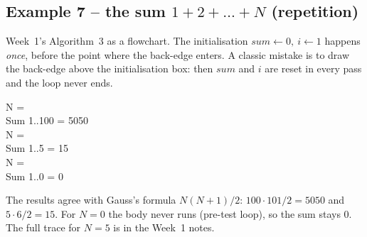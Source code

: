 \documentclass[11pt,a4paper]{article}
\begin{document}
\subsection{Example 7 -- the sum $1 + 2 + \dots + N$ (repetition)}\label{ex:sum}
Week~1's Algorithm~3 as a flowchart. The initialisation $sum \gets 0,\ i \gets 1$ happens \emph{once}, before the point where the back-edge enters. A classic mistake is to draw the back-edge above the initialisation box: then $sum$ and $i$ are reset in every pass and the loop never ends.
\begin{center}
\begin{minipage}[c]{0.46\linewidth}\centering
{}
\end{minipage}\hfill
\begin{minipage}[c]{0.5\linewidth}
\begin{consolebox}
N = \\ Sum 1..100 = 5050\\
N = \\ Sum 1..5 = 15\\
N = \\ Sum 1..0 = 0
\end{consolebox}
\raggedright The results agree with Gauss's formula $N(N+1)/2$: $100\cdot101/2 = 5050$ and $5\cdot 6/2 = 15$. For $N=0$ the body never runs (pre-test loop), so the sum stays $0$. The full trace for $N=5$ is in the Week~1 notes.
\end{minipage}
\end{center}
\end{document}
